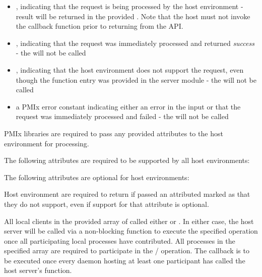 \begin{itemize}
    \item {}, indicating that the request is being processed by the host environment - result will be returned in the provided . Note that the host must not invoke the callback function prior to returning from the \ac{API}.
    \item {}, indicating that the request was immediately processed and returned \textit{success} - the  will not be called
    \item {}, indicating that the host environment does not support the request, even though the function entry was provided in the server module - the  will not be called
    \item a PMIx error constant indicating either an error in the input or that the request was immediately processed and failed - the  will not be called
\end{itemize}

\reqattrstart
\ac{PMIx} libraries are required to pass any provided attributes to the host environment for processing.

\divider

The following attributes are required to be supported by all host environments:


\reqattrend

\optattrstart
The following attributes are optional for host environments:


\optattrend

\advicermstart
Host environment are required to return  if passed an attributed marked as  that they do not support, even if support for that attribute is optional.
\advicermend

\descr

All local clients in the provided array of  called either  or .
In either case, the host server will be called via a non-blocking function to execute the specified operation once all participating local processes have contributed.
All processes in the specified  array are required to participate in the / operation.
The callback is to be executed once every daemon hosting at least one participant has called the host server's  function.

